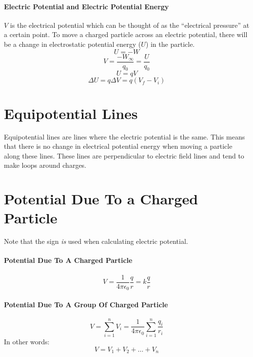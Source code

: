 \documentclass{article}
\begin{document}
        \paragraph{Electric Potential and Electric Potential Energy}
        $V$ is the electrical potential which can be thought of as the ``electrical pressure'' at a certain point. To move a charged particle across an electric potential, there will be a change in electrostatic potential energy ($U$) in the particle.
        \begin{equation}
            U = -W
        \end{equation}
        \begin{equation}
            V = \frac{-W_\infty}{q_0} = \frac{U}{q_0}
        \end{equation}
        \begin{equation}
            U = q V
        \end{equation}
        \begin{equation}
            \Delta U = q \Delta V = q \left( V_f - V_i \right)
        \end{equation}

    \section{Equipotential Lines}
        
        Equipotential lines are lines where the electric potential is the same. This means that there is no change in electrical potential energy when moving a particle along these lines. These lines are perpendicular to electric field lines and tend to make loops around charges.

    
    \section{Potential Due To a Charged Particle}

        Note that the sign \textit{is} used when calculating electric potential.
        
        \paragraph{Potential Due To A Charged Particle}
        \begin{equation}
            V = \frac{1}{4\pi\epsilon_0} \frac{q}{r} = k \frac{q}{r}
        \end{equation}

        \paragraph{Potential Due To A Group Of Charged Particle}
        \begin{equation}
            V = \sum_{i=1}^{n} V_i = \frac{1}{4\pi\epsilon_0} \sum_{i=1}^{n} \frac{q_i}{r_i}
        \end{equation}
        In other words:
        \begin{equation}
            V = V_1 + V_2 + \ldots + V_n
        \end{equation}
    
\end{document}
